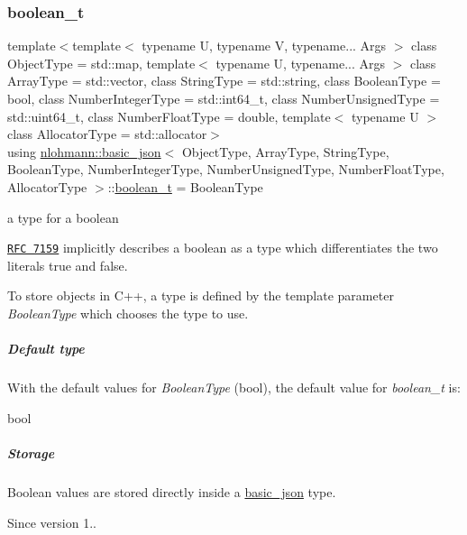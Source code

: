 \subsubsection{\texorpdfstring{boolean\+\_\+t}{boolean\_t}}
{\footnotesize\ttfamily template$<$template$<$ typename U, typename V, typename... Args $>$ class Object\+Type = std\+::map, template$<$ typename U, typename... Args $>$ class Array\+Type = std\+::vector, class String\+Type  = std\+::string, class Boolean\+Type  = bool, class Number\+Integer\+Type  = std\+::int64\+\_\+t, class Number\+Unsigned\+Type  = std\+::uint64\+\_\+t, class Number\+Float\+Type  = double, template$<$ typename U $>$ class Allocator\+Type = std\+::allocator$>$ \\
using \hyperlink{classnlohmann_1_1basic__json}{nlohmann\+::basic\+\_\+json}$<$ Object\+Type, Array\+Type, String\+Type, Boolean\+Type, Number\+Integer\+Type, Number\+Unsigned\+Type, Number\+Float\+Type, Allocator\+Type $>$\+::\hyperlink{classnlohmann_1_1basic__json_af3bc3e83aa162d7ba4df16a949872723}{boolean\+\_\+t} =  Boolean\+Type}



a type for a boolean 

\href{http://rfc7159.net/rfc7159}{\tt R\+FC 7159} implicitly describes a boolean as a type which differentiates the two literals {\ttfamily true} and {\ttfamily false}.

To store objects in C++, a type is defined by the template parameter {\itshape Boolean\+Type} which chooses the type to use.

\subparagraph*{Default type}

With the default values for {\itshape Boolean\+Type} ({\ttfamily bool}), the default value for {\itshape boolean\+\_\+t} is\+:


\begin{DoxyCode}
\textcolor{keywordtype}{bool}
\end{DoxyCode}


\subparagraph*{Storage}

Boolean values are stored directly inside a \hyperlink{classnlohmann_1_1basic__json}{basic\+\_\+json} type.

\begin{DoxySince}{Since}
version 1.. 
\end{DoxySince}
\hypertarget{classnlohmann_1_1basic__json_a74a0013e847fdc574b48f931f0e757e1}{}\label{classnlohmann_1_1basic__json_a74a0013e847fdc574b48f931f0e757e1} 
